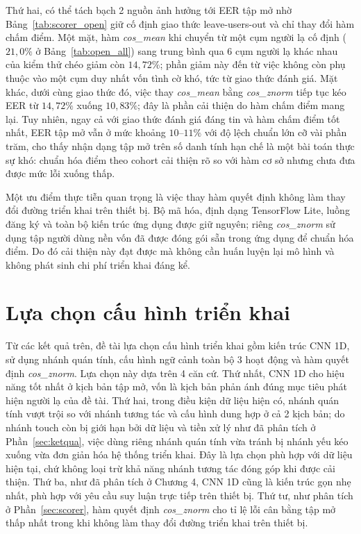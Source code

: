 \documentclass[../DoAn.tex]{subfiles}
\begin{document}
Thứ hai, có thể tách bạch 2 nguồn ảnh hưởng tới EER tập mở nhờ Bảng~\ref{tab:scorer_open} giữ cố định giao thức leave-users-out và chỉ thay đổi hàm chấm điểm. Một mặt, hàm \textit{cos\_mean} khi chuyển từ một cụm người lạ cố định ($21,0\%$ ở Bảng~\ref{tab:open_all}) sang trung bình qua 6 cụm người lạ khác nhau của kiểm thử chéo giảm còn $14,72\%$; phần giảm này đến từ việc không còn phụ thuộc vào một cụm duy nhất vốn tình cờ khó, tức từ giao thức đánh giá. Mặt khác, dưới cùng giao thức đó, việc thay \textit{cos\_mean} bằng \textit{cos\_znorm} tiếp tục kéo EER từ $14,72\%$ xuống $10,83\%$; đây là phần cải thiện do hàm chấm điểm mang lại. Tuy nhiên, ngay cả với giao thức đánh giá đáng tin và hàm chấm điểm tốt nhất, EER tập mở vẫn ở mức khoảng $10$--$11\%$ với độ lệch chuẩn lớn cỡ vài phần trăm, cho thấy nhận dạng tập mở trên số danh tính hạn chế là một bài toán thực sự khó: chuẩn hóa điểm theo cohort cải thiện rõ so với hàm cơ sở nhưng chưa đưa được mức lỗi xuống thấp.

Một ưu điểm thực tiễn quan trọng là việc thay hàm quyết định không làm thay đổi đường triển khai trên thiết bị. Bộ mã hóa, định dạng TensorFlow Lite, luồng đăng ký và toàn bộ kiến trúc ứng dụng được giữ nguyên; riêng \textit{cos\_znorm} sử dụng tập người dùng nền vốn đã được đóng gói sẵn trong ứng dụng để chuẩn hóa điểm. Do đó cải thiện này đạt được mà không cần huấn luyện lại mô hình và không phát sinh chi phí triển khai đáng kể.

\section{Lựa chọn cấu hình triển khai}
\label{sec:luachon}

Từ các kết quả trên, đề tài lựa chọn cấu hình triển khai gồm kiến trúc CNN 1D, sử dụng nhánh quán tính, cấu hình ngữ cảnh toàn bộ 3 hoạt động và hàm quyết định \textit{cos\_znorm}. Lựa chọn này dựa trên 4 căn cứ. Thứ nhất, CNN 1D cho hiệu năng tốt nhất ở kịch bản tập mở, vốn là kịch bản phản ánh đúng mục tiêu phát hiện người lạ của đề tài. Thứ hai, trong điều kiện dữ liệu hiện có, nhánh quán tính vượt trội so với nhánh tương tác và cấu hình dung hợp ở cả 2 kịch bản; do nhánh touch còn bị giới hạn bởi dữ liệu và tiền xử lý như đã phân tích ở Phần~\ref{sec:ketqua}, việc dùng riêng nhánh quán tính vừa tránh bị nhánh yếu kéo xuống vừa đơn giản hóa hệ thống triển khai. Đây là lựa chọn phù hợp với dữ liệu hiện tại, chứ không loại trừ khả năng nhánh tương tác đóng góp khi được cải thiện. Thứ ba, như đã phân tích ở Chương 4, CNN 1D cũng là kiến trúc gọn nhẹ nhất, phù hợp với yêu cầu suy luận trực tiếp trên thiết bị. Thứ tư, như phân tích ở Phần~\ref{sec:scorer}, hàm quyết định \textit{cos\_znorm} cho tỉ lệ lỗi cân bằng tập mở thấp nhất trong khi không làm thay đổi đường triển khai trên thiết bị.
\end{document}
